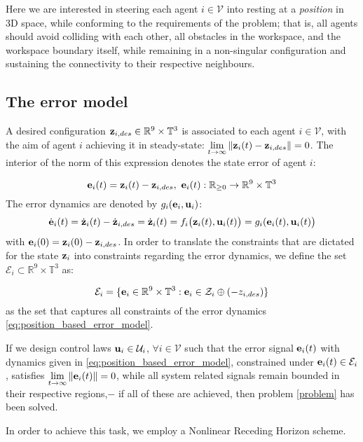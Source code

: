 Here we are interested in steering each agent $i \in \mathcal{V}$ into
resting at a \textit{position} in 3D space, while conforming to the requirements
of the problem; that is, all agents should avoid colliding with each other, all
obstacles in the workspace, and the workspace boundary itself, while remaining
in a non-singular configuration and sustaining the connectivity to their
respective neighbours.

\subsection{The error model}

A desired configuration $\bm{\mathbf{z}}_{i,des} \in \mathbb{R}^9 \times \mathbb{T}^3$
is associated to each agent $i \in \mathcal{V}$, with the aim of agent $i$
achieving it in steady-state:
$\lim\limits_{t \to \infty} \|\bm{\mathbf{z}}_i(t) - \bm{\mathbf{z}}_{i,des}\| = 0$. The
interior of the norm of this expression denotes the state error of agent $i$:

$$\bm{\mathbf{e}}_i(t) = \bm{\mathbf{z}}_i(t) - \bm{\mathbf{z}}_{i,des},\ \bm{\mathbf{e}}_i(t) :
\mathbb{R}_{\geq 0} \to \mathbb{R}^9 \times \mathbb{T}^3$$
The error dynamics are denoted by $g_i(\bm{\mathbf{e}}_i, \bm{\mathbf{u}}_i)$:
\begin{align}
  \dot{\bm{\mathbf{e}}}_i(t) = \dot{\bm{\mathbf{z}}}_i(t) - \dot{\bm{\mathbf{z}}}_{i,des} =
  \dot{\bm{\mathbf{z}}}_i(t) = f_i\big(\bm{\mathbf{z}}_i(t), \bm{\mathbf{u}}_i(t)\big) = g_i(\bm{\mathbf{e}}_i(t), \bm{\mathbf{u}}_i(t)\big)
  \label{eq:position_based_error_model}
\end{align}
with $\bm{\mathbf{e}}_i(0) = \bm{\mathbf{z}}_i(0) - \bm{\mathbf{z}}_{i,des}$. In order to translate
the constraints that are dictated for the state $\bm{\mathbf{z}}_i$ into constraints
regarding the error dynamics, we define the set
$\mathcal{E}_i \subset \mathbb{R}^9 \times \mathbb{T}^3$ as:

$$\mathcal{E}_i = \{\bm{\mathbf{e}}_i \in \mathbb{R}^9 \times \mathbb{T}^3 :
\bm{\mathbf{e}}_i \in \mathcal{Z}_i \oplus (-z_{i,des} )\}$$
as the set that captures all constraints of the error dynamics
\eqref{eq:position_based_error_model}.

If we design control laws $\bm{\mathbf{u}}_i \in \mathcal{U}_i$,
$\forall i \in \mathcal{V}$ such that the error signal $\bm{\mathbf{e}}_i(t)$ with
dynamics given in \eqref{eq:position_based_error_model}, constrained under
$\bm{\mathbf{e}}_i(t) \in \mathcal{E}_i$, satisfies
$\lim\limits_{t \to \infty} \|\bm{\mathbf{e}}_i(t)\| = 0$, while all system related
signals remain bounded in their respective regions,$-$ if all of these are
achieved, then problem \eqref{problem} has been solved.

In order to achieve this task, we employ a Nonlinear Receding Horizon scheme.

